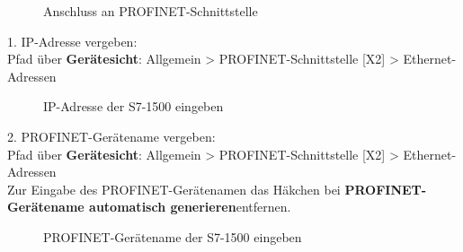 \begin{figure}[H]
   \centering
   \caption[Anschluss an PROFINET-Schnittstelle]{Anschluss an PROFINET-Schnittstelle}
   \label{fig:Bild3.11}
\end{figure}

1. IP-Adresse vergeben:\\
Pfad über \textbf{Gerätesicht}: Allgemein > PROFINET-Schnittstelle [X2] > Ethernet-Adressen
\begin{figure}[H]
   \centering
   \caption[IP-Adresse der S7-1500 eingeben]{IP-Adresse der S7-1500 eingeben}
   \label{fig:Bild3.12}
\end{figure}

\clearpage

2. PROFINET-Gerätename vergeben:\\
Pfad über \textbf{Gerätesicht}: Allgemein > PROFINET-Schnittstelle [X2] > Ethernet-Adressen\\
\newline
Zur Eingabe des PROFINET-Gerätenamen das Häkchen bei \glqq\textbf{PROFINET-Gerätename automatisch generieren}\grqq\:entfernen.

\begin{figure}[H]
   \centering
   \caption[PROFINET-Gerätename der S7-1500 eingeben]{PROFINET-Gerätename der S7-1500 eingeben}
   \label{fig:Bild3.13}
\end{figure}